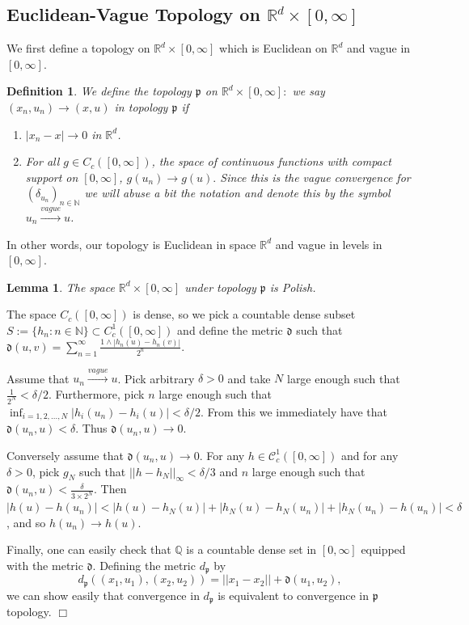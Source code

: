 \documentclass[12pt]{article}
\newenvironment {proof}{{\noindent\bf Proof }}{\hfill $\Box$ \medskip}
\newtheorem{lemma}[theorem]{Lemma}
\newtheorem{definition}[theorem]{Definition}
\begin{document}
\subsection{Euclidean-Vague Topology on $\mathbb{R}^d \times [0,\infty]$}\label{sec: Convergence in Product Topology}
We first define a topology on $\mathbb{R}^d \times [0,\infty]$ which is Euclidean on $\mathbb{R}^d$ and vague in $[0,\infty]$.
\begin{definition}
We define the topology $\mathfrak{p}$ on $\mathbb{R}^d \times [0,\infty]:$
we say $(x_n,u_n) \to (x,u)$ in topology $\mathfrak{p}$ if 
\begin{enumerate}
    \item $|x_n-x| \to 0$ in $\mathbb{R}^d$.
    \item  For all $g \in C_{c}([0,\infty])$, the space of continuous functions with compact support on $[0,\infty]$, $g(u_n) \to g(u).$ Since this is the vague convergence for $(\delta_{u_n})_{n \in \mathbb{N}}$ we will abuse a bit the notation and denote this by the symbol $u_n \xrightarrow{vague} u$. 
\end{enumerate}
\end{definition}

In other words, our topology is Euclidean in space $\mathbb{R}^d$ and vague in levels in $[0,\infty]$.
\begin{lemma}\label{Vague times Euclidean is Polish}
The space $\mathbb{R}^d \times [0,\infty]$ under topology $\mathfrak{p}$ is Polish.
\end{lemma}
\begin{proof}
The space $C_c([0,\infty])$ is dense, so we pick a countable dense subset $S:=\{h_n: n \in \mathbb{N}\} \subset C^{1}_c([0,\infty])$ and define the metric $\mathfrak{d}$ such that $\mathfrak{d}(u,v)=\sum_{n=1}^{\infty}\frac{1 \wedge |h_n(u)-h_n(v)|}{2^n}$.

Assume that $u_n \xrightarrow{vague} u$. Pick arbitrary $\delta>0$ and take $N$ large enough such that $\frac{1}{2^N}<\delta/2$. Furthermore, pick $n$ large enough such that $\inf_{i=1,2,...,N}|h_i(u_n)-h_i(u)|<\delta/2$. From this we immediately have that $\mathfrak{d}(u_n,u)<\delta$. Thus $\mathfrak{d}(u_n,u) \to 0$.

Conversely assume that $\mathfrak{d}(u_n,u) \to 0$. For any $h \in \mathcal{C}^{1}_c([0,\infty])$ and for any $\delta>0$, pick $g_N$ such that $||h-h_N||_{\infty}<\delta /3$ and $n$ large enough such that $\mathfrak{d}(u_n,u)< \frac{\delta}{3 \times 2^N}$. Then $|h(u)-h(u_n)|< |h(u)-h_N(u)|+|h_N(u)-h_N(u_n)|+|h_N(u_n)-h(u_n)|<\delta$, and so $h(u_n) \to h(u)$.

Finally, one can easily check that $\mathbb{Q}$ is a countable dense set in $[0,\infty]$ equipped with the metric $\mathfrak{d}$.
Defining the metric $d_{\mathfrak{p}}$
by
$$d_{\mathfrak{p}}((x_1,u_1),(x_2,u_2))=||x_1-x_2||+\mathfrak{d}(u_1,u_2),$$
we can show easily that
convergence in $d_{\mathfrak{p}}$
is equivalent to convergence in 
$\mathfrak{p}$ topology.
\end{proof}
\end{document}
